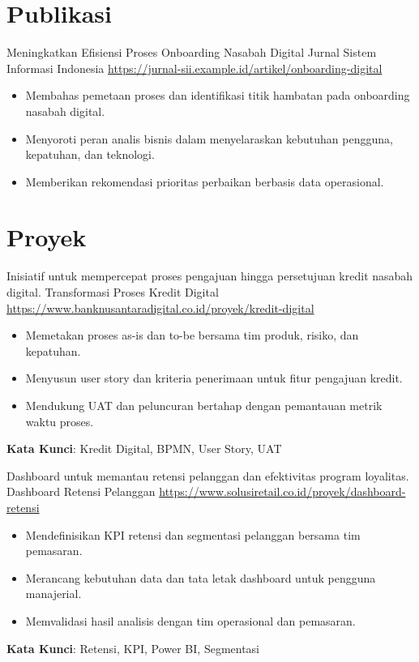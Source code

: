 \documentclass[a4paper, serif, 10pt]{moderncv}
\begin{document}
\section{Publikasi}

        {Meningkatkan Efisiensi Proses Onboarding Nasabah Digital}
        {Jurnal Sistem Informasi Indonesia}
        {\url{https://jurnal-sii.example.id/artikel/onboarding-digital}}
        {}
        {\begin{itemize}
\item Membahas pemetaan proses dan identifikasi titik hambatan pada onboarding nasabah digital.
\item Menyoroti peran analis bisnis dalam menyelaraskan kebutuhan pengguna, kepatuhan, dan teknologi.
\item Memberikan rekomendasi prioritas perbaikan berbasis data operasional.
\end{itemize}}
\section{Proyek}

        {Inisiatif untuk mempercepat proses pengajuan hingga persetujuan kredit nasabah digital.}
        {Transformasi Proses Kredit Digital}
        {\url{https://www.banknusantaradigital.co.id/proyek/kredit-digital}}
        {}
        {\begin{itemize}
\item Memetakan proses as-is dan to-be bersama tim produk, risiko, dan kepatuhan.
\item Menyusun user story dan kriteria penerimaan untuk fitur pengajuan kredit.
\item Mendukung UAT dan peluncuran bertahap dengan pemantauan metrik waktu proses.
\end{itemize}
\textbf{Kata Kunci}: Kredit Digital, BPMN, User Story, UAT}

        {Dashboard untuk memantau retensi pelanggan dan efektivitas program loyalitas.}
        {Dashboard Retensi Pelanggan}
        {\url{https://www.solusiretail.co.id/proyek/dashboard-retensi}}
        {}
        {\begin{itemize}
\item Mendefinisikan KPI retensi dan segmentasi pelanggan bersama tim pemasaran.
\item Merancang kebutuhan data dan tata letak dashboard untuk pengguna manajerial.
\item Memvalidasi hasil analisis dengan tim operasional dan pemasaran.
\end{itemize}
\textbf{Kata Kunci}: Retensi, KPI, Power BI, Segmentasi}
\end{document}
